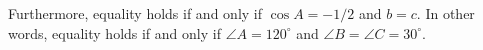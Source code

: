 \documentclass{article}
\begin{document}
Furthermore, equality holds if and only if $\cos A = -1/2$ and $b = c$. In other words, equality holds if and only if $\angle A = 120^\circ$ and $\angle B = \angle C = 30^\circ$.

%
%
%
%
\end{document}
